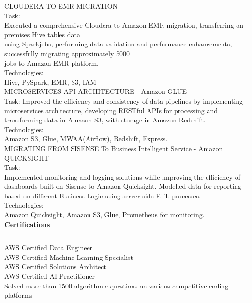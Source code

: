\documentclass[11pt,a4paper]{article}
\renewcommand{\section}[1]{%
  \vspace{12pt}%
  {\large\bfseries #1}%
  \vspace{6pt}%
  \hrule%
  \vspace{6pt}%
}
\begin{document}
CLOUDERA TO EMR MIGRATION\\[0.2cm]
Task:\\[0.2cm]
Executed a comprehensive Cloudera to Amazon EMR migration, transferring on-premises Hive tables data\\[0.2cm]
using Sparkjobs, performing data validation and performance enhancements, successfully migrating approximately 5000\\[0.2cm]
jobs to Amazon EMR platform.\\[0.2cm]
Technologies:\\[0.2cm]
Hive, PySpark, EMR, S3, IAM\\[0.2cm]
MICROSERVICES API ARCHITECTURE - Amazon GLUE\\[0.2cm]
Task: Improved the efficiency and consistency of data pipelines by implementing microservices architecture, developing RESTful APIs for processing and transforming data in Amazon S3, with storage in Amazon Redshift.\\[0.2cm]
Technologies:\\[0.2cm]
Amazon S3, Glue, MWAA(Airflow), Redshift, Express.\\[0.2cm]
MIGRATING FROM SISENSE To Business Intelligent Service - Amazon QUICKSIGHT\\[0.2cm]
Task:\\[0.2cm]
Implemented monitoring and logging solutions while improving the efficiency of dashboards built on Sisense to Amazon Quicksight. Modelled data for reporting based on different Business Logic using server-side ETL processes.\\[0.2cm]
Technologies:\\[0.2cm]
Amazon Quicksight, Amazon S3, Glue, Prometheus for monitoring.\\[0.2cm]
\section{Certifications}

AWS Certified Data Engineer\\[0.2cm]
AWS Certified Machine Learning Specialist\\[0.2cm]
AWS Certified Solutions Architect\\[0.2cm]
AWS Certified AI Practitioner\\[0.2cm]
Solved more than 1500 algorithmic questions on various competitive coding platforms\\[0.2cm]
\end{document}
